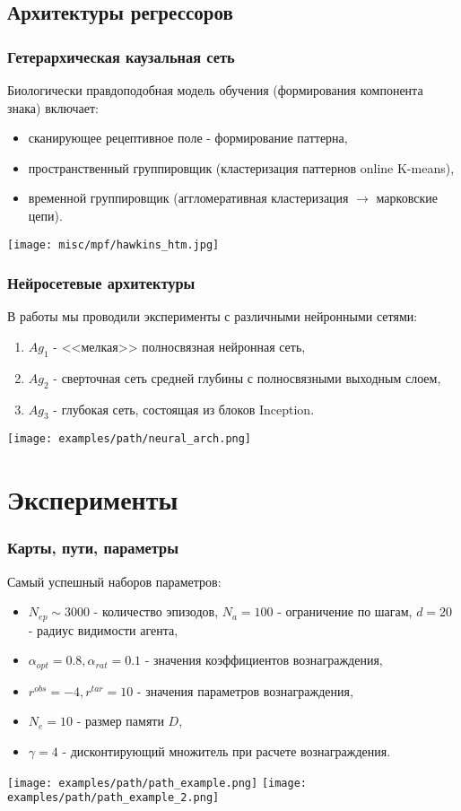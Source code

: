\documentclass[default]{beamer}
\begin{document}
	\subsection{Архитектуры регрессоров}
	\begin{frame}
		\frametitle{Гетерархическая каузальная сеть}
		Биологически правдоподобная модель обучения (формирования компонента знака) включает:
		\begin{itemize}
			\item сканирующее рецептивное поле - формирование паттерна,
			\item пространственный группировщик (кластеризация паттернов online K-means),
			\item временной группировщик (аггломеративная кластеризация $\rightarrow$ марковские цепи).
		\end{itemize}
		\centering
		\vspace*{-3pt}
		\texttt{[image: misc/mpf/hawkins\_htm.jpg]}
	\end{frame}

	\begin{frame}
		\frametitle{Нейросетевые архитектуры}
		В работы мы проводили эксперименты с различными нейронными сетями:
		\begin{enumerate}
			\item $Ag_1$ - <<мелкая>> полносвязная нейронная сеть,
			\item $Ag_2$ - сверточная сеть средней глубины с полносвязными выходным слоем,
			\item $Ag_3$ - глубокая сеть, состоящая из блоков Inception.
		\end{enumerate}
		\centering
		\texttt{[image: examples/path/neural\_arch.png]}
	\end{frame}

	\section{Эксперименты}
	\begin{frame}
		\frametitle{Карты, пути, параметры}
		Самый успешный наборов параметров:
		\begin{itemize}
			\item $N_{ep}\sim 3000$ - количество эпизодов, $N_a=100$ - ограничение по шагам, $d=20$ - радиус видимости агента,
			\item $\alpha_{opt}=0.8,\alpha_{rat}=0.1$ - значения коэффициентов вознаграждения,
			\item $r^{obs}=-4,r^{tar}=10$ - значения параметров вознаграждения,
			\item $N_e=10$ - размер памяти $D$,
			\item $\gamma=4$ - дисконтирующий множитель при расчете вознаграждения.
		\end{itemize}
		\centering
		\texttt{[image: examples/path/path\_example.png]}
		\texttt{[image: examples/path/path\_example\_2.png]}
	\end{frame}
\end{document}
